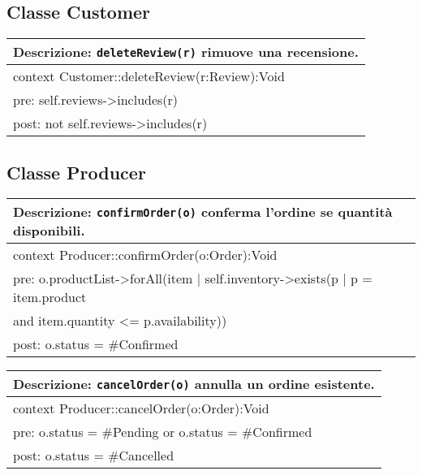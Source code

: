 \FloatBarrier

\subsection{Classe Customer}





\begin{table}[H]
  \centering
  \begin{tabular}{p{}}
    \toprule
    \textbf{Descrizione:} \texttt{deleteReview(r)} rimuove una recensione.\\
    \midrule
    context Customer::deleteReview(r:Review):Void\\
    \quad pre: self.reviews->includes(r)\\
    \quad post: not self.reviews->includes(r)\\
    \bottomrule
  \end{tabular}
\end{table}
\FloatBarrier

\subsection{Classe Producer}

\begin{table}[H]
  \centering
  \begin{tabular}{p{}}
    \toprule
    \textbf{Descrizione:} \texttt{confirmOrder(o)} conferma l’ordine se quantità disponibili.\\
    \midrule
    context Producer::confirmOrder(o:Order):Void\\
    \quad pre: o.productList->forAll(item | self.inventory->exists(p | p = item.product \\ \hspace{6.5cm} and item.quantity <= p.availability))\\
    \quad post: o.status = \#Confirmed\\
    \bottomrule
  \end{tabular}
\end{table}

\begin{table}[H]
  \centering
  \begin{tabular}{p{}}
    \toprule
    \textbf{Descrizione:} \texttt{cancelOrder(o)} annulla un ordine esistente.\\
    \midrule
    context Producer::cancelOrder(o:Order):Void\\
    \quad pre: o.status = \#Pending or o.status = \#Confirmed\\
    \quad post: o.status = \#Cancelled\\
    \bottomrule
  \end{tabular}
\end{table}
\FloatBarrier

